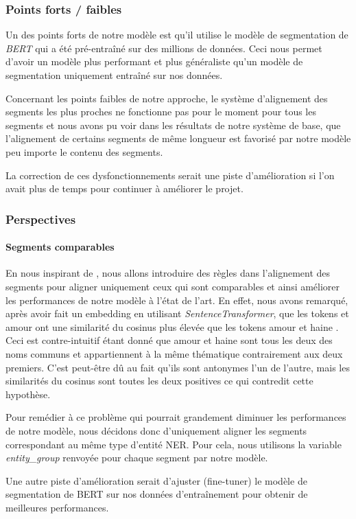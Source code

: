 \documentclass[a4paper, twoside, 11pt]{article}
\begin{document}
 \subsubsection{Points forts / faibles}
 Un des points forts de notre modèle est qu'il utilise le modèle de segmentation de \textit{BERT} qui a été pré-entraîné sur des millions de données. Ceci nous permet d'avoir un modèle plus performant et plus généraliste qu'un modèle de segmentation uniquement entraîné sur nos données.

Concernant les points faibles de notre approche, le système d'alignement des segments les plus proches ne fonctionne pas pour le moment pour tous les segments et nous avons pu voir dans les résultats de notre système de base, que l'alignement de certains segments de même longueur est favorisé par notre modèle peu importe le contenu des segments.

La correction de ces dysfonctionnements serait une piste d'amélioration si l'on avait plus de temps pour continuer à améliorer le projet.
 \subsubsection{Perspectives}
 \paragraph{Segments comparables}
       \hfill \break
En nous inspirant de \cite{banjade}, nous allons introduire des règles dans l’alignement des segments pour aligner uniquement ceux qui sont \og comparables \fg{} et ainsi améliorer les performances de notre modèle à l'état de l'art. En effet, nous avons remarqué, après avoir fait un \og embedding \fg{} en utilisant \textit{SentenceTransformer}, que les tokens  \fg{} et \og amour \fg{} ont une similarité du cosinus plus élevée que les tokens \og amour \fg{} et  \og haine \fg{}. Ceci est contre-intuitif étant donné que \og amour \fg{} et \og haine \fg{} sont tous les deux des noms communs et appartiennent à la même thématique contrairement aux deux premiers. C'est peut-être dû au fait qu'ils sont antonymes l’un de l’autre, mais les similarités du cosinus sont toutes les deux positives ce qui contredit cette hypothèse.

Pour remédier à ce problème qui pourrait grandement diminuer les performances de notre modèle, nous décidons donc d’uniquement aligner les segments correspondant au même type d’entité NER. Pour cela, nous utilisons la variable \textit{entity\_group} renvoyée pour chaque segment par notre modèle.

 Une autre piste d'amélioration serait d'ajuster (fine-tuner) le modèle de segmentation de BERT sur nos données d'entraînement pour obtenir de meilleures performances.
    \printbibliography
\end{document}
